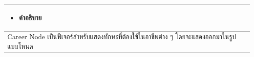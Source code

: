 \begin{table}[H]
\begin{tabular}{|l|}
\begin{minipage}{\linewidth}
  \begin{itemize}
    \item คำอธิบาย
  \end{itemize}
\end{minipage}                                                                                                                                                                                                                                                                                                                                                                                                                                                                                                                            \\ \hline
\begin{minipage}{\linewidth}
  \raggedright
Career Node เป็นฟีเจอร์สำหรับแสดงทักษะที่ต้องใช้ในอาชีพต่าง ๆ โดยจะแสดงออกมาในรูปแบบโหนด
\end{minipage}
\\ \hline
\end{tabular}
\end{table}

